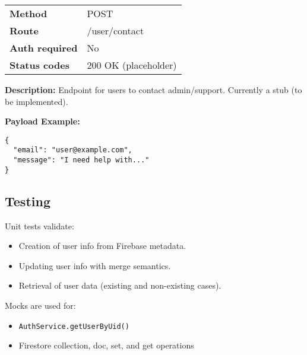 \begin{tabular}{>{\bfseries}l l}
\toprule
Method & POST \\
Route & /user/contact \\
Auth required & No \\
Status codes & 200 OK (placeholder) \\
\bottomrule
\end{tabular}

\textbf{Description:} Endpoint for users to contact admin/support. Currently a stub (to be implemented).

\vspace{1em}
\textbf{Payload Example:}
\begin{verbatim}
{
  "email": "user@example.com",
  "message": "I need help with..."
}
\end{verbatim}

\subsection*{Testing}

Unit tests validate:

\begin{itemize}
    \item Creation of user info from Firebase metadata.
    \item Updating user info with merge semantics.
    \item Retrieval of user data (existing and non-existing cases).
\end{itemize}

Mocks are used for:

\begin{itemize}
    \item \texttt{AuthService.getUserByUid()}
    \item Firestore collection, doc, set, and get operations
\end{itemize}
